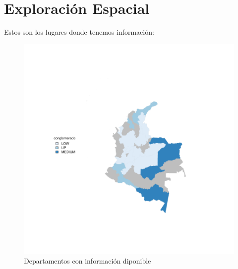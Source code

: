 \documentclass{article}
\begin{document}




\section{Exploración Espacial}

Estos son los lugares donde tenemos información:






 
 
\begin{figure}[h]
\centering
\begin{adjustbox}{width=18cm,height=13cm,clip,trim=1.5cm 2cm 0cm 2.5cm}
\includegraphics{basico32departamentos-plotMap0}
\end{adjustbox}
\caption{Departamentos con información diponible}\label{rawmap}
\end{figure}
\end{document}
